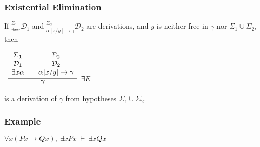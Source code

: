 \documentclass{beamer}
\theoremstyle{indentDefn} \newtheorem{defn}[]{Definition}
\begin{document}
\begin{frame}
	\frametitle{Existential Elimination}
	
	If $^{\Sigma_{1}}_{\exists x \alpha}\mathcal{D}_{1}$ and $^{\Sigma_{2}}_{\alpha[x/y]\rightarrow\gamma}\mathcal{D}_{2}$ are derivations, and $y$ is neither free in $\gamma$ nor $\Sigma_{1} \cup \Sigma_{2
	}$, then
	
	\begin{center}
	$\begin{array}{ c }
	
	\infer[\exists E]{\gamma}
	{
		\begin{array}{c} \Sigma_{1}  \\ \mathcal{D}_{1} \\ \exists x \alpha \end{array}
		& 
		\begin{array}{c} \Sigma_{2}  \\ \mathcal{D}_{2} \\ \alpha[x/y]\rightarrow\gamma \end{array}				
	}	
	
	\end{array}$
	\end{center}

	is a derivation of $\gamma$ from hypotheses $\Sigma_{1} \cup \Sigma_{2}$. 
	
	
\end{frame}



\begin{frame}
	\frametitle{Example}
	
	$\forall x (Px \rightarrow Qx), \ \exists x Px \ \vdash \ \exists x Qx$
	
	
	\vspace{65mm}
	
\end{frame}
\end{document}
